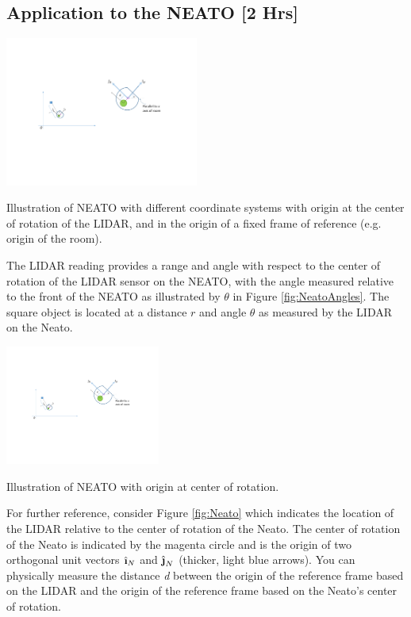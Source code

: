 \documentclass[M3_Night6_Solutions]{subfiles}
\begin{document}
\begin{enumerate}[series=exercises, label=\textbf{Exercise} (\arabic*)]
\begin{enumerate}[resume=exercises, label=\textbf{Exercise} (\arabic*)]
\clearpage

\section{Application to the NEATO [2 Hrs]}

\begin{marginfigure}
\includegraphics[width=2.5in]{figs/NeatoCoordinateFrame.pdf}
\caption{Illustration of NEATO with different coordinate systems with origin at the center of rotation of the LIDAR, and in the origin of a fixed frame of reference (e.g. origin of the room).}
\label{fig:NeatoAngles}
\end{marginfigure}
The LIDAR reading provides a range and angle with respect to the center of rotation of the LIDAR sensor on the NEATO, with the angle measured relative to the front of the NEATO as illustrated by $\theta$ in Figure \ref{fig:NeatoAngles}. The square object is located at a distance $r$ and angle $\theta$  as measured by the LIDAR on the Neato. 

\begin{marginfigure}
\includegraphics[width=2.0in]{figs/NeatoFrameZoom.pdf}
\caption{Illustration of NEATO with origin at center of rotation.}
\label{fig:Neato}
\end{marginfigure}

For further reference, consider Figure \ref{fig:Neato} which indicates the location of the LIDAR relative to the center of rotation of the Neato. The center of rotation of the Neato is indicated by the magenta circle and is the origin of two orthogonal unit vectors $\ihat_N$ and $\jhat_N$ (thicker, light blue arrows). You can physically measure the distance \textit{d} between the origin of the reference frame based on the LIDAR and the origin of the reference frame based on the Neato's center of rotation.


\end{enumerate}
\end{enumerate}
\end{document}
